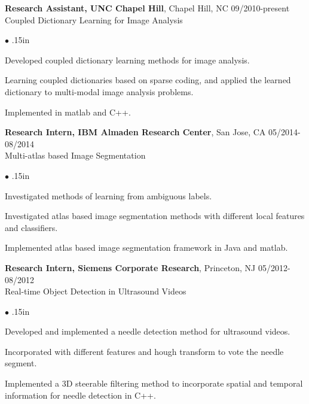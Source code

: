 \documentclass[line,margin]{res}
\newenvironment{bullets}{\begin{list}{\tiny$\bullet$}{\topsep 0pt \itemsep -2pt \leftmargin .15in}}{\vspace*{4pt}\end{list}}
\begin{document}
\begin{resume}
\textbf{Research Assistant, UNC Chapel Hill}, Chapel Hill, NC  \hfill      09/2010-present \\
Coupled Dictionary Learning for Image Analysis %
\begin{bullets}
	\item Developed coupled dictionary learning methods for image analysis.
	\item Learning coupled dictionaries based on sparse coding, and applied the learned dictionary to multi-modal image analysis problems.
	\item Implemented in matlab and C++.
\end{bullets}
\vspace{-.1in}


\textbf{Research Intern, IBM Almaden Research Center}, San Jose, CA \hfill      05/2014-08/2014 \\
Multi-atlas based Image Segmentation
\begin{bullets} 
\item Investigated methods of learning from ambiguous labels.
\item Investigated atlas based image segmentation methods with different local features and classifiers.
\item Implemented atlas based image segmentation framework in Java and matlab.
\end{bullets}
\vspace{-.1in}

\textbf{Research Intern, Siemens Corporate Research}, Princeton, NJ \hfill      05/2012-08/2012 \\
Real-time Object Detection in Ultrasound Videos
\begin{bullets} 
\item Developed and implemented a needle detection method for ultrasound videos. 
\item Incorporated with different features and hough transform to vote the needle segment.
\item Implemented a 3D steerable filtering method to incorporate spatial and temporal information for needle detection in C++.


\end{bullets}
\end{resume}
\end{document}
